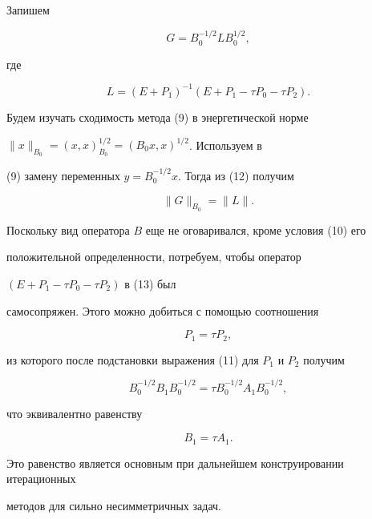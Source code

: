 Запишем 


\begin{equation} 


G=B^{-1/2}_0 L B^{1/2}_0, 


\end{equation} 


где 


\begin{equation} 


L=(E+P_1)^{-1}(E+P_1-\tau P_0 -\tau P_2). 


\end{equation} 


Будем изучать сходимость метода (9) в энергетической норме 


$\|x\|_{B_0}=(x,x)^{1/2}_{B_0}=(B_0 x, x)^{1/2}$. Используем в 


(9) замену переменных $y=B^{-1/2}_0 x$. Тогда из (12) получим 


\begin{equation} 


\|G\|_{B_0}=\|L\|. 


\end{equation} 


Поскольку вид оператора $B$ еще не оговаривался, кроме условия (10) его 


положительной определенности, потребуем, чтобы оператор  


$(E+P_1 -\tau P_0 - \tau P_2)$ в (13) был 


самосопряжен. Этого можно добиться с помощью соотношения 


$$ 


P_1 = \tau P_2, 


$$ 


из которого после подстановки выражения (11) для $P_1$ и $P_2$ получим 


$$ 


B^{-1/2}_0 B_1 B^{-1/2}_0=\tau B^{-1/2}_0 A_1 B^{-1/2}_0, 


$$ 


что эквивалентно равенству 


\begin{equation} 


B_1=\tau A_1. 


\end{equation} 


Это равенство является основным при дальнейшем конструировании итерационных 


методов для сильно несимметричных задач. 


